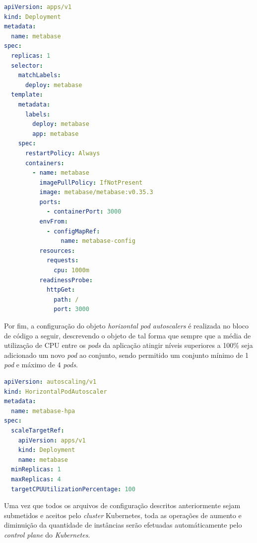 \begin{lstlisting}[language=yaml]
apiVersion: apps/v1
kind: Deployment
metadata:
  name: metabase
spec:
  replicas: 1
  selector:
    matchLabels:
      deploy: metabase
  template:
    metadata:
      labels:
        deploy: metabase
        app: metabase
    spec:
      restartPolicy: Always
      containers:
        - name: metabase
          imagePullPolicy: IfNotPresent
          image: metabase/metabase:v0.35.3
          ports:
            - containerPort: 3000
          envFrom:
            - configMapRef:
                name: metabase-config
          resources:
            requests:
              cpu: 1000m
          readinessProbe:
            httpGet:
              path: /
              port: 3000
\end{lstlisting} 

Por fim, a configuração do objeto \textit{horizontal pod autoscalers} é realizada no bloco de código a seguir, descrevendo o objeto de tal forma que sempre que a média de utilização de CPU entre os \textit{pods} da aplicação atingir níveis superiores a 100\% seja adicionado um novo \textit{pod} ao conjunto, sendo permitido um conjunto mínimo de 1 \textit{pod} e máximo de 4 \textit{pods}. 

\begin{lstlisting}[language=yaml]
apiVersion: autoscaling/v1
kind: HorizontalPodAutoscaler
metadata:
  name: metabase-hpa
spec:
  scaleTargetRef:
    apiVersion: apps/v1
    kind: Deployment
    name: metabase
  minReplicas: 1
  maxReplicas: 4
  targetCPUUtilizationPercentage: 100
\end{lstlisting} 

Uma vez que todos os arquivos de configuração descritos anteriormente sejam submetidos e aceitos pelo \textit{cluster} Kubernetes, toda as operações de aumento e diminuição da quantidade de instâncias serão efetuadas automáticamente pelo \textit{control plane} do \textit{Kubernetes}.  
